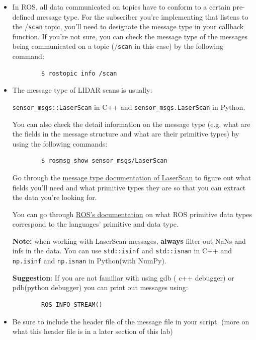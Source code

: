 \documentclass[letta4 paper]{article}
\numberwithin{equation}{section}
\newcommand{\0}{\mathbf{0}}
\begin{document}
	\begin{itemize}
		\item In ROS, all data communicated on topics have to conform to a certain pre-defined message type. For the subscriber you're implementing that listens to the /\texttt{scan} topic, you'll need to designate the message type in your callback function. If you're not sure, you can check the message type of the messages being communicated on a topic (/\texttt{scan} in this case) by the following command:
		
		\begin{lstlisting}
		$ rostopic info /scan
		\end{lstlisting}
		
		\item The message type of LIDAR scans is usually:
		
		\texttt{sensor\_msgs::LaserScan} in C++ and \texttt{sensor\_msgs.LaserScan} in Python.
		
		You can also check the detail information on the message type (e.g. what are the fields in the message structure and what are their primitive types) by using the following commands:
		
		\begin{lstlisting}
		$ rosmsg show sensor_msgs/LaserScan
		\end{lstlisting}
		
		Go through the \href{http://docs.ros.org/melodic/api/sensor_msgs/html/msg/LaserScan.html}{message type documentation of LaserScan} to figure out what fields you'll need and what primitive types they are so that you can extract the data you're looking for.
		
		You can go through \href{https://wiki.ros.org/msg}{ROS's documentation} on what ROS primitive data types correspond to the languages' primitive and data type.
		
		\textbf{Note:} when working with LaserScan messages, \textbf{always} filter out NaNs and infs in the data. You can use \texttt{std::isinf} and \texttt{std::isnan} in C++ and \texttt{np.isinf} and \texttt{np.isnan} in Python(with NumPy).
		
		\textbf{Suggestion}: If you are not familiar with using gdb ( c++ debugger) or pdb(python debugger) you can print out messages using:
		\begin{lstlisting}
		ROS_INFO_STREAM()
		\end{lstlisting}
		
		\item Be sure to include the header file of the message file in your script. (more on what this header file is in a later section of this lab) 
	\end{itemize}{}
	
\end{document}
